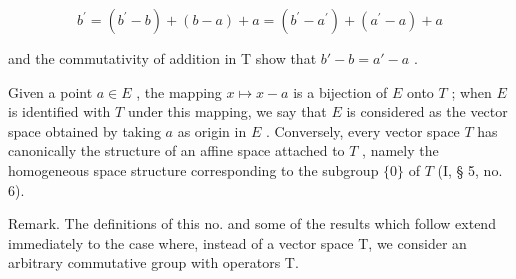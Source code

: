 \[
b ^ {\prime} = \left(b ^ {\prime} - b\right) + (b - a) + a = \left(b ^ {\prime} - a ^ {\prime}\right) + \left(a ^ {\prime} - a\right) + a
\]

and the commutativity of addition in T show that \(b' - b = a' - a\) .

Given a point \(a \in E\) , the mapping \(x \mapsto x - a\) is a bijection of \(E\) onto \(T\) ; when \(E\) is identified with \(T\) under this mapping, we say that \(E\) is considered as the vector space obtained by taking \(a\) as origin in \(E\) . Conversely, every vector space \(T\) has canonically the structure of an affine space attached to \(T\) , namely the homogeneous space structure corresponding to the subgroup \(\{0\}\) of \(T\) (I, § 5, no. 6).

Remark. The definitions of this no. and some of the results which follow extend immediately to the case where, instead of a vector space T, we consider an arbitrary commutative group with operators T.

